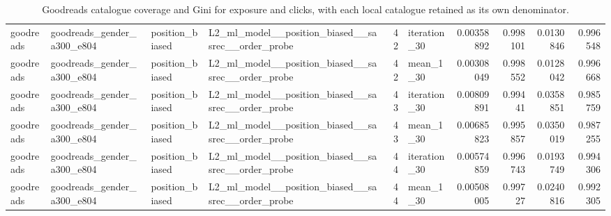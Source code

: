 \begin{table}[htbp!]
\begin{tabular}{llllrlrrrr}
goodreads & goodreads\_gender\_a300\_e804 & position\_biased & L2\_ml\_model\_\_position\_biased\_\_sasrec\_\_order\_probe & 42 & iteration\_30 & 0.00358892 & 0.998101 & 0.0130846 & 0.996548 \\
goodreads & goodreads\_gender\_a300\_e804 & position\_biased & L2\_ml\_model\_\_position\_biased\_\_sasrec\_\_order\_probe & 42 & mean\_1\_30 & 0.00308049 & 0.998552 & 0.0128042 & 0.996668 \\
goodreads & goodreads\_gender\_a300\_e804 & position\_biased & L2\_ml\_model\_\_position\_biased\_\_sasrec\_\_order\_probe & 43 & iteration\_30 & 0.00809891 & 0.99441 & 0.0358851 & 0.985759 \\
goodreads & goodreads\_gender\_a300\_e804 & position\_biased & L2\_ml\_model\_\_position\_biased\_\_sasrec\_\_order\_probe & 43 & mean\_1\_30 & 0.00685823 & 0.995857 & 0.0350019 & 0.987255 \\
goodreads & goodreads\_gender\_a300\_e804 & position\_biased & L2\_ml\_model\_\_position\_biased\_\_sasrec\_\_order\_probe & 44 & iteration\_30 & 0.00574859 & 0.996743 & 0.0193749 & 0.994306 \\
goodreads & goodreads\_gender\_a300\_e804 & position\_biased & L2\_ml\_model\_\_position\_biased\_\_sasrec\_\_order\_probe & 44 & mean\_1\_30 & 0.00508005 & 0.99727 & 0.0240816 & 0.992305 \\
\hline
\end{tabular}
\caption{Goodreads catalogue coverage and Gini for exposure and clicks, with each local catalogue retained as its own denominator.}
\label{chap:results:tab:rq6_goodreads_coverage_concentration_summaries}
\end{table}
